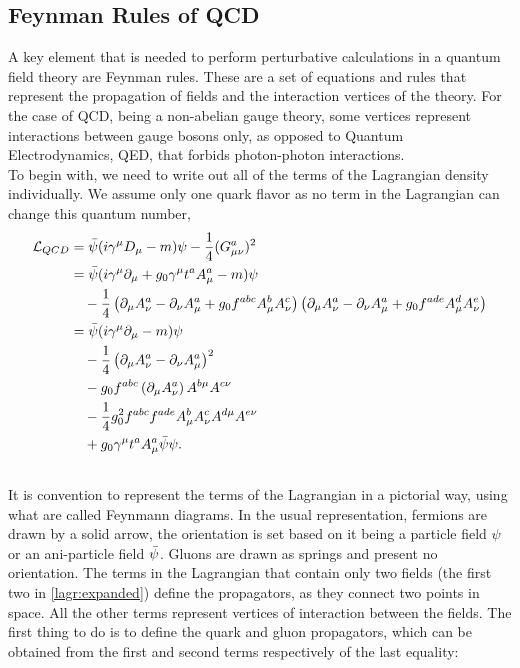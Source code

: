 \subsection{Feynman Rules of QCD}
A key element that is needed to perform perturbative calculations in a quantum field theory are Feynman rules. These are a set of equations and rules that represent the propagation of fields and the interaction vertices of the theory. For the case of QCD, being a non-abelian gauge theory, some vertices represent interactions between gauge bosons only, as opposed to Quantum Electrodynamics, QED, that forbids photon-photon interactions. \\
To begin with, we need to write out all of the terms of the Lagrangian density individually. We assume only one quark flavor as no term in the Lagrangian can change this quantum number,
\begin{align}\nonumber
    \mathcal{L}_{QCD} &= \bar{\psi}(i\gamma^\mu D_\mu - m)\psi -\frac{1}{4}(G_{\mu\nu}^a)^2 \\
    &= \bar{\psi}(i\gamma^\mu \partial_\mu  + g_0\gamma^\mu t^aA_\mu^a - m)\psi \\\nonumber
    &~~~-\frac{1}{4}\left( \partial_\mu A_\nu^a - \partial_\nu A_\mu^a + g_0f^{abc}A_\mu^b A_\nu^c \right) \left(\partial_\mu A_\nu^a - \partial_\nu A_\mu^a + g_0f^{ade}A_\mu^d A_\nu^e \right) \\\nonumber
    &= \bar{\psi}(i\gamma^\mu\partial_\mu - m)\psi \label{lagr:expanded} \\
    &~~~-\frac{1}{4}\left(\partial_\mu A_\nu^a - \partial_\nu A_\mu^a\right)^2 \\\nonumber
    &~~~- g_0f^{abc}\left(\partial_\mu A^a_\nu \right) A^{b\mu} A^{c\nu} \\\nonumber
    &~~~-\frac{1}{4}g_0^2f^{abc}f^{ade}A_\mu^bA_\nu^cA^{d\mu}A^{e\nu}  \\\nonumber
    &~~~+g_0\gamma^\mu t^a A_\mu^a \bar{\psi}\psi. \\\nonumber
\end{align}
It is convention to represent the terms of the Lagrangian in a pictorial way, using what are called Feynmann diagrams. In the usual representation, fermions are drawn by a solid arrow, the orientation is set based on it being a particle field $\psi$ or an ani-particle field $\bar{\psi}$. Gluons are drawn as springs and present no orientation. The terms in the Lagrangian that contain only two fields (the first two in \cref{lagr:expanded}) define the propagators, as they connect two points in space. All the other terms represent vertices of interaction between the fields.
The first thing to do is to define the quark and gluon propagators, which can be obtained from the first and second terms respectively of the last equality:


